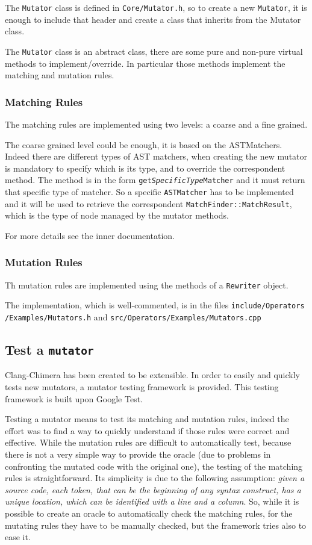 \documentclass[10pt,a4paper]{article}
\begin{document}
The \texttt{Mutator} class is defined in \texttt{Core/Mutator.h}, so to create a new \texttt{Mutator}, it is enough to include that header and create a class that inherits from the Mutator class.

The \texttt{Mutator} class is an abstract class, there are some pure and non-pure virtual methods to implement/override. In particular those methods implement the matching and mutation rules.

\subsubsection{Matching Rules}
The matching rules are implemented using two levels: a coarse and a fine grained.

The coarse grained level could be enough, it is based on the ASTMatchers. Indeed there are different types of AST matchers, when creating the new mutator is mandatory to specify which is its type, and to override the correspondent method. The method is in the form \texttt{get\textit{SpecificType}Matcher} and it must return that specific type of matcher. So a specific \texttt{ASTMatcher} has to be implemented and it will be used to retrieve the correspondent \texttt{MatchFinder::MatchResult}, which is the type of node managed by the mutator methods.

For more details see the inner documentation.
\subsubsection{Mutation Rules}
Th mutation rules are implemented using the methods of a \texttt{Rewriter} object.

The implementation, which is well-commented, is in the files \texttt{include/Operators /Examples/Mutators.h} and \texttt{src/Operators/Examples/Mutators.cpp}

\subsection{Test a \texttt{mutator}}
\label{par:test_framework}
Clang-Chimera has been created to be extensible. In order to easily and quickly tests new mutators, a mutator testing framework is provided. This testing framework is built upon Google Test.

Testing a mutator means to test its matching and mutation rules, indeed the effort was to find a way to quickly understand if those rules were correct and effective. While the mutation rules are difficult to automatically test, because there is not a very simple way to provide the oracle (due to problems in confronting the mutated code with the original one), the testing of the matching rules is straightforward. Its simplicity is due to the following assumption: \textit{given a source code, each token, that can be the beginning of any syntax construct, has a unique location, which can be identified with a line and a column}.
So, while it is possible to create an oracle to automatically check the matching rules, for the mutating rules they have to be manually checked, but the framework tries also to ease it.
\end{document}
